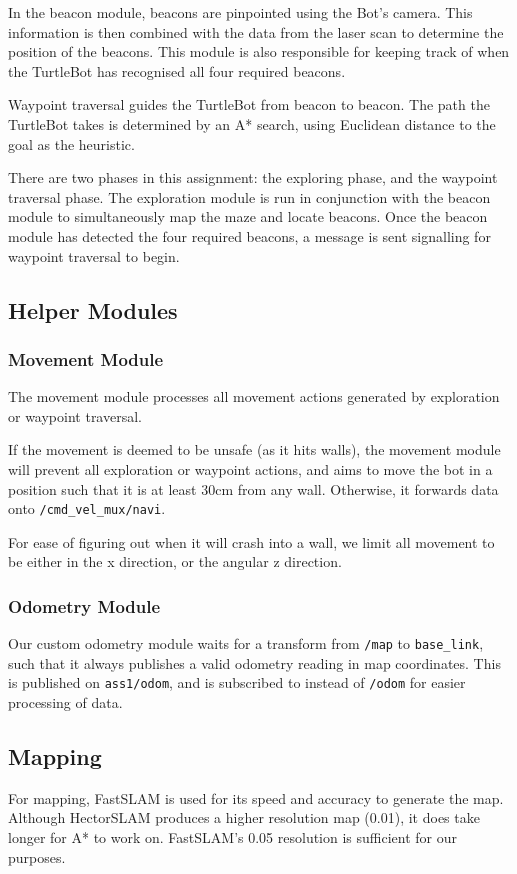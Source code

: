 \documentclass[titlepage,12pt,a4paper]{article}
\begin{document}
In the beacon module, beacons are pinpointed using the Bot's camera. This information is then combined with the data from the laser scan to determine the position of the beacons. This module is also responsible for keeping track of when the TurtleBot has recognised all four required beacons. 

Waypoint traversal guides the TurtleBot from beacon to beacon. The path the TurtleBot takes is determined by an A* search, using Euclidean distance to the goal as the heuristic. 

There are two phases in this assignment: the exploring phase, and the waypoint traversal phase. The exploration module is run in conjunction with the beacon module to simultaneously map the maze and locate beacons. Once the beacon module has detected the four required beacons, a message is sent signalling for waypoint traversal to begin. 

\subsection{Helper Modules}
\subsubsection{Movement Module}
The movement module processes all movement actions generated by exploration or waypoint traversal. 

If the movement is deemed to be unsafe (as it hits walls), the movement module will prevent all exploration or waypoint actions, and aims to move the bot in a position such that it is at least 30cm from any wall. Otherwise, it forwards data onto \verb|/cmd_vel_mux/navi|. 

For ease of figuring out when it will crash into a wall, we limit all movement to be either in the x direction, or the angular z direction.

\subsubsection{Odometry Module}
Our custom odometry module waits for a transform from \verb|/map| to \verb|base_link|, such that it always publishes a valid odometry reading in map coordinates. This is published on \verb|ass1/odom|, and is subscribed to instead of \verb|/odom| for easier processing of data.

\subsection{Mapping}
For mapping, FastSLAM is used for its speed and accuracy to generate the map. Although HectorSLAM produces a higher resolution map (0.01), it does take longer for A* to work on. FastSLAM's 0.05 resolution is sufficient for our purposes.
\end{document}
